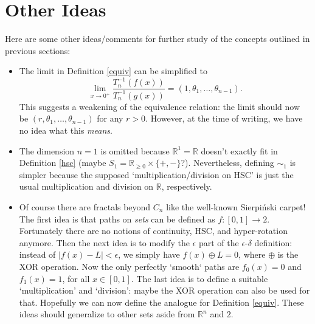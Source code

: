 \documentclass{article}
\theoremstyle{plain}
\begin{document}
\section{Other Ideas}
Here are some other ideas/comments for further study of the concepts outlined in previous sections:
\begin{itemize}
	\item The limit in Definition \ref{equiv} can be simplified to $$\lim_{x \rightarrow 0^+}\frac{T_n^{-1}(f(x))}{T_n^{-1}(g(x))} = (1, \theta_1, \ldots, \theta_{n-1}).$$ This suggests a weakening of the equivalence relation: the limit should now be $(r, \theta_1, \ldots, \theta_{n-1})$ for any $r > 0$. However, at the time of writing, we have no idea what this \textit{means}.
	\item The dimension $n=1$ is omitted because $\mathbb{R}^1=\mathbb{R}$ doesn't exactly fit in Definition \ref{hsc} (maybe $S_1 = \mathbb{R}_{\ge 0} \times \{+, -\}$?). Nevertheless, defining $\sim_1$ is simpler because the supposed `multiplication/division on HSC' is just the usual multiplication and division on $\mathbb{R}$, respectively.
	\item Of course there are fractals beyond $C_n$ like the well-known Sierpiński carpet! The first idea is that paths on \textit{sets} can be defined as $f:[0,1] \rightarrow 2$. Fortunately there are no notions of continuity, HSC, and hyper-rotation anymore. Then the next idea is to modify the $\epsilon$ part of the $\epsilon$-$\delta$ definition: instead of $|f(x)-L|<\epsilon$, we simply have $f(x) \oplus L = 0$, where $\oplus$ is the XOR operation. Now the only perfectly `smooth` paths are $f_0(x)=0$ and $f_1(x)=1$, for all $x\in[0,1]$. The last idea is to define a suitable `multiplication' and `division': maybe the XOR operation can also be used for that. Hopefully we can now define the analogue for Definition \ref{equiv}. These ideas should generalize to other sets aside from $\mathbb{R}^n$ and $2$.
\end{itemize}



\end{document}
